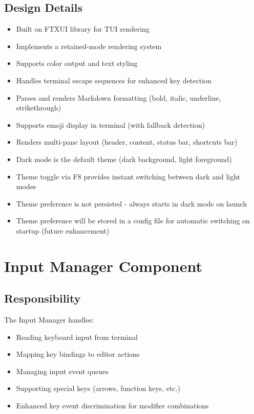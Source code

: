 \documentclass[12pt,a4paper,oneside,openany]{report}
\begin{document}
\subsection{Design Details}

\begin{itemize}
	\item Built on FTXUI library for TUI rendering
	\item Implements a retained-mode rendering system
	\item Supports color output and text styling
	\item Handles terminal escape sequences for enhanced key detection
	\item Parses and renders Markdown formatting (bold, italic, underline, strikethrough)
	\item Supports emoji display in terminal (with fallback detection)
	\item Renders multi-pane layout (header, content, status bar, shortcuts bar)
	\item Dark mode is the default theme (dark background, light foreground)
	\item Theme toggle via F8 provides instant switching between dark and light modes
	\item Theme preference is not persisted - always starts in dark mode on launch
	\item Theme preference will be stored in a config file for automatic switching on startup (future enhancement)
\end{itemize}

\section{Input Manager Component}

\subsection{Responsibility}

The Input Manager handles:

\begin{itemize}
	\item Reading keyboard input from terminal
	\item Mapping key bindings to editor actions
	\item Managing input event queues
	\item Supporting special keys (arrows, function keys, etc.)
	\item Enhanced key event discrimination for modifier combinations
\end{itemize}
\end{document}
